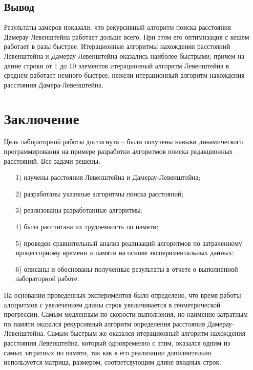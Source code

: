 \documentclass[a4paper,14pt, unknownkeysallowed]{extreport}
\begin{document}
	\section*{Вывод}
	
	Результаты замеров показали, что рекурсивный алгоритм поиска расстояния Дамерау-Левенштейна работает дольше всего. 
    При этом его оптимизация с кешем работает в разы быстрее. 
    Итерационные алгоритмы нахождения расстояний Левенштейна и Дамерау-Левенштейна оказались наиболее быстрыми, причем на длине строки от 1 до 10 элементов итерационный алгоритм Левенштейна в среднем работает немного быстрее, нежели итерационный алгоритм нахождения расстояния Дамера-Левенштейна. 
	
\chapter*{Заключение}
	
Цель лабораторной работы достигнута -- были получены навыки динамического программирования на примере разработки алгоритмов поиска редакционных расстояний. Все задачи решены:
	
	\begin{enumerate}
		\item[1)] изучены расстояния Левенштейна и Дамерау-Левенштейна;
		\item[2)] разработаны указнные алгоритмы поиска расстояний;
		\item[3)] реализованы разработанные алгоритмы;
		\item[4)] была рассчитана их трудоемкость по памяти;
		\item[5)] проведен сравнительный анализ реализаций алгоритмов по затраченному процессорному времени и памяти на основе экспериментальных данных;
		\item[6)] описаны и обоснованы полученные результаты в отчете о выполненной лабораторной работе.
	\end{enumerate}
	
	На основании проведенных экспериментов было определено, что время работы алгоритмов с увелечением длины строк увеличивается в геометрической прогрессии. 
    Самым медленным по скорости выполнения, но наименне затратным по памяти оказался рекурсивный алгоритм определения расстояния Дамерау-Левенштейна.
    Самым быстрым же оказался итерационный алгоритм нахождения расстояния Левенштейна, который одновременно с этим, оказался одним из самых затратных по памяти, так как в его реализации дополнительно используется матрица, размером, соответсвующим длине входных строк.
	

\nocite{*} 

\renewcommand\bibname{Список использованных источников} %
	
\end{document}
